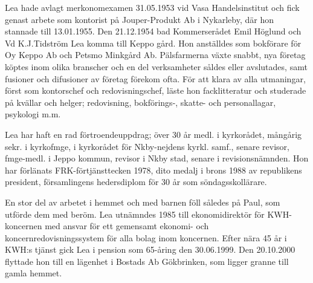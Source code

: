 Lea hade avlagt merkonomexamen 31.05.1953 vid Vasa Handelsinstitut och fick genast arbete som kontorist på Jouper-Produkt Ab i Nykarleby, där hon stannade till 13.01.1955. Den 21.12.1954 bad Kommerserådet Emil Höglund och Vd K.J.Tidström Lea komma till Keppo gård. Hon anställdes som bokförare för Oy Keppo Ab och Petsmo Minkgård Ab. Pälsfarmerna växte snabbt, nya företag köptes inom olika branscher och en del verksamheter såldes eller avslutades, samt fusioner och difusioner av företag förekom ofta. För att klara av alla utmaningar, först som kontorschef och redovisningschef, läste hon facklitteratur och studerade på kvällar och helger; redovisning, bokförings-, skatte- och personallagar, psykologi m.m.

Lea har haft en rad förtroendeuppdrag; över 30 år medl. i kyrkorådet, mångårig sekr. i kyrkofmge, i kyrkorådet för Nkby-nejdens kyrkl. samf., senare revisor, fmge-medl. i Jeppo kommun, revisor i Nkby stad, senare i revisionsnämnden. Hon har förlänats FRK-förtjänsttecken 1978, dito medalj i brons 1988 av republikens president, församlingens hedersdiplom för 30 år som söndagsskollärare.

En stor del av arbetet i hemmet och med barnen föll således på Paul, som utförde dem med beröm. Lea utnämndes 1985 till ekonomidirektör för KWH-koncernen med ansvar för ett gemensamt ekonomi- och koncernredovisningssystem för alla bolag inom koncernen. Efter nära 45 år i KWH:s tjänst gick Lea i pension som 65-åring den 30.06.1999. Den 20.10.2000 flyttade hon till en lägenhet i Bostads Ab Gökbrinken, som ligger granne till gamla hemmet.


